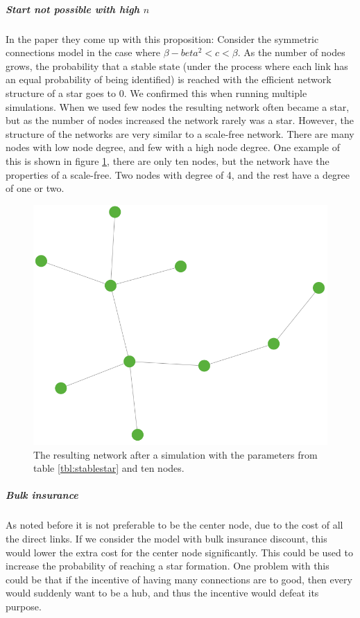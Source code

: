 \subparagraph{Start not possible with high $n$}
In the paper \cite{jackson2005survey} they come up with this proposition:
Consider the symmetric connections model in the case where $\beta-beta^2<c<\beta$. As the number of nodes grows, the probability that a stable state (under the
process where each link has an equal probability of being identified) is reached with the
efficient network structure of a star goes to 0.
We confirmed this when running multiple simulations. When we used few nodes the resulting network often became a star, but as the number of nodes increased the network rarely was a star.
However, the structure of the networks are very similar to a scale-free network. There are many nodes with low node degree, and few with a high node degree.
One example of this is shown in figure \ref{fig:stablescalefree}, there are only ten nodes, but the network have the properties of a scale-free. Two nodes with degree of 4, and the rest have a degree of one or two.
\begin{figure}[h]
\centering
  \includegraphics[width=0.5\linewidth]{../Figures/stability/Unefficientbutstabletwo.png}
  \caption{\label{fig:stablescalefree} The resulting network after a simulation with the parameters from table \ref{tbl:stablestar} and ten nodes.}
\end{figure}
\subparagraph{Bulk insurance}
As noted before it is not preferable to be the center node, due to the cost of all the direct links. If we consider the model with bulk insurance discount, this would lower the extra cost for the center node significantly. This could be used to increase the probability of reaching a star formation. One problem with this could be that if the incentive of having many connections are to good, then every would suddenly want to be a hub, and thus the incentive would defeat its purpose. 

